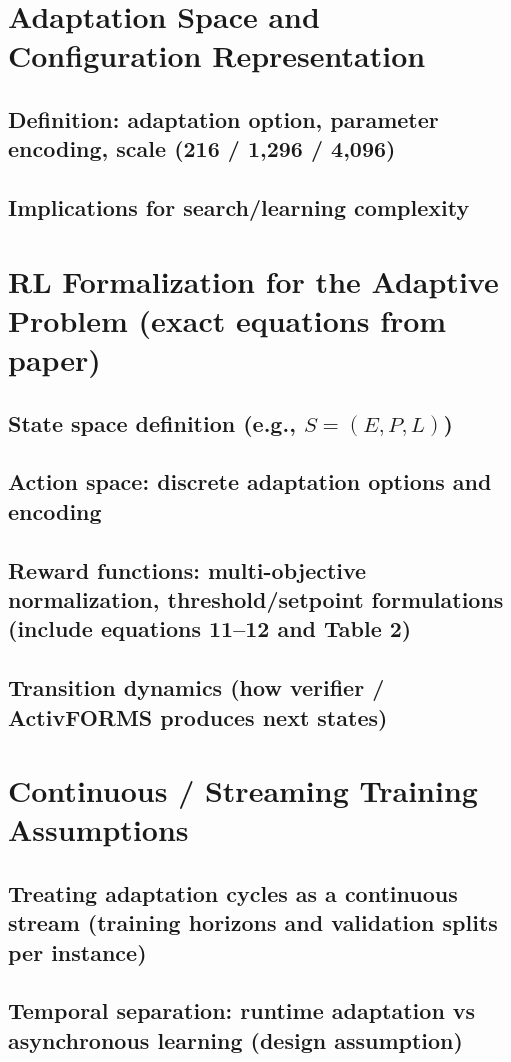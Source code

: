 \documentclass[11pt,a4paper]{article}
\begin{document}
\section{Adaptation Space and Configuration Representation}
\subsection{Definition: adaptation option, parameter encoding, scale (216 / 1,296 / 4,096)}
\subsection{Implications for search/learning complexity}

\section{RL Formalization for the Adaptive Problem (exact equations from paper)}
\subsection{State space definition (e.g., $S = (E, P, L)$)}
\subsection{Action space: discrete adaptation options and encoding}
\subsection{Reward functions: multi-objective normalization, threshold/setpoint formulations (include equations 11--12 and Table 2)}
\subsection{Transition dynamics (how verifier / ActivFORMS produces next states)}

\section{Continuous / Streaming Training Assumptions}
\subsection{Treating adaptation cycles as a continuous stream (training horizons and validation splits per instance)}
\subsection{Temporal separation: runtime adaptation vs asynchronous learning (design assumption)}
\end{document}
